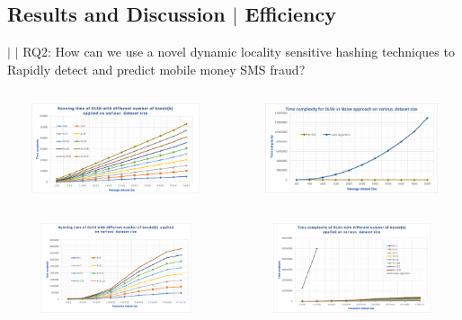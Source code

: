 \documentclass[11pt,aspectratio=169]{beamer}
\begin{document}
		\subsection{Results and Discussion $|$ Efficiency}
		\begin{frame}{$|$ {$|$ \footnotesize{RQ2: How can we use a novel dynamic locality sensitive hashing techniques to Rapidly detect and predict         mobile money SMS fraud?}}}
				\begin{columns}
	
				\includegraphics[width=225pt, height=75pt]{assets/smseff1.png}
				
				
				
				\includegraphics[width=225pt, height=75pt]{assets/naivesmseff2.png}
				
				
			\end{columns}
			\begin{columns}
			\column{0.5\textwidth}
			\includegraphics[width=225pt, height=75pt]{assets/transeff1.png}

			
			
			\column{0.5\textwidth}
			\includegraphics[width=225pt, height=75pt]{assets/transnaiveeff.png}
		
		\end{columns}
			
			
		\end{frame}
	
\end{document}
